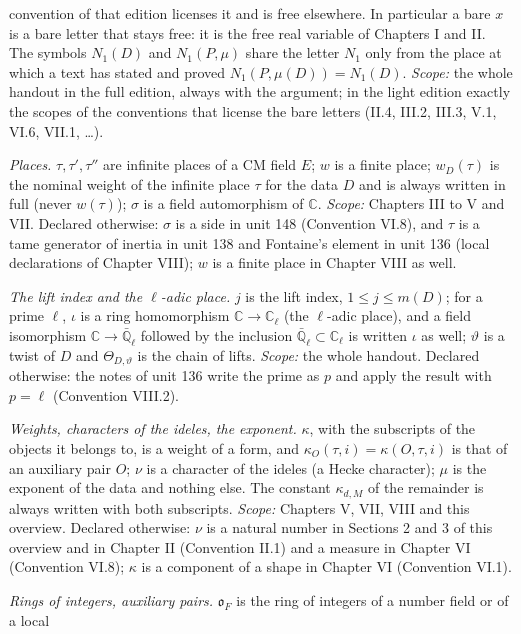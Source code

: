 \begin{description}[font=\bfseries,leftmargin=2.6em,labelwidth=2.2em,itemsep=0.1em,topsep=0.2em,parsep=0.1em]
convention of that edition licenses it and is free elsewhere. In particular a bare $x$ is a bare letter that stays free: it is the free real
variable of Chapters I and II. The symbols $N_1(D)$ and $N_1(P,\mu)$ share the letter $N_1$ only from the place at which a text has
stated and proved $N_1(P,\mu(D))=N_1(D)$.
\emph{Scope:} the whole handout in the full edition, always with the argument; in the light edition exactly the scopes of the
conventions that license the bare letters (II.4, III.2, III.3, V.1, VI.6, VII.1, \dots).
\item[0.4] \emph{Places.} $\tau,\tau',\tau''$ are infinite places of a CM field $E$; $w$ is a finite place; $w_D(\tau)$ is the
nominal weight of the infinite place $\tau$ for the data $D$ and is always written in full (never $w(\tau)$); $\sigma$ is
a field automorphism of $\mathbb{C}$.
\emph{Scope:} Chapters III to V and VII. Declared otherwise: $\sigma$ is a side in unit 148 (Convention VI.8), and $\tau$ is a
tame generator of inertia in unit 138 and Fontaine's element in unit 136 (local declarations of Chapter VIII); $w$ is a
finite place in Chapter VIII as well.
\item[0.5] \emph{The lift index and the $\ell$-adic place.} $j$ is the lift index, $1\le j\le m(D)$; for a prime $\ell$,
$\iota$ is a ring homomorphism $\mathbb{C}\to\mathbb{C}_\ell$ (the $\ell$-adic place), and a field isomorphism
$\mathbb{C}\to\bar{\mathbb{Q}}_\ell$ followed by the inclusion $\bar{\mathbb{Q}}_\ell\subset\mathbb{C}_\ell$ is written
$\iota$ as well; $\vartheta$ is a twist of $D$ and $\Theta_{D,\vartheta}$ is the chain of lifts.
\emph{Scope:} the whole handout. Declared otherwise: the notes of unit 136 write the prime as $p$ and apply the result with
$p=\ell$ (Convention VIII.2).
\item[0.6] \emph{Weights, characters of the ideles, the exponent.} $\kappa$, with the subscripts of the objects it belongs
to, is a weight of a form, and $\kappa_O(\tau,i)=\kappa(O,\tau,i)$ is that of an auxiliary pair $O$; $\nu$ is a character of
the ideles (a Hecke character); $\mu$ is the exponent of the data and nothing else. The constant $\kappa_{d,M}$ of the
remainder is always written with both subscripts.
\emph{Scope:} Chapters V, VII, VIII and this overview. Declared otherwise: $\nu$ is a natural number in Sections 2 and 3 of this overview and in Chapter II
(Convention II.1) and a measure in Chapter VI (Convention VI.8); $\kappa$ is a component of a shape in Chapter VI
(Convention VI.1).
\item[0.7] \emph{Rings of integers, auxiliary pairs.} $\mathfrak{o}_F$ is the ring of integers of a number field or of a local

\end{description}
